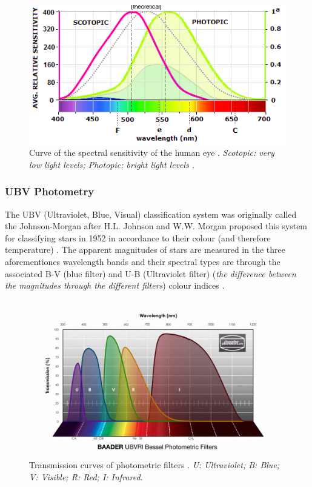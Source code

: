 \documentclass[12pt]{article}
\begin{document}
\begin{figure}[H]
    \centering
    \includegraphics[width=12.5cm]{eye spectra curve.png}
    \caption{\centering Curve of the spectral sensitivity of the human eye \protect\cite{eyecurve}. \textit{Scotopic: very low light levels; Photopic: bright light levels \protect\cite{scophoto}.}}
    \label{fig:1}
\end{figure}

\subsubsection{UBV Photometry} \label{sec:1.1.1}

The UBV (Ultraviolet, Blue, Visual) classification system was originally called the Johnson-Morgan after H.L. Johnson and W.W. Morgan proposed this system for classifying stars in 1952 in accordance to their colour 
(and therefore temperature)
\cite{ubv1953}.
The apparent magnitudes of stars are measured in the three aforementiones wavelength bands and their spectral types are through the associated B-V (blue filter) and U-B (Ultraviolet filter)
(\textit{the difference between the magnitudes through the different filters}) colour indices
\cite{ubv1953}.

\begin{figure}[H]
    \centering
    \includegraphics[width=12.5cm]{ubv.jpeg}
    \caption{\centering Transmission curves of photometric filters \protect\cite{ubvfilters}. \textit{U: Ultraviolet; B: Blue; V: Visible; R: Red; I: Infrared.}}
    \label{fig:ubvfilters}
\end{figure}
\end{document}
